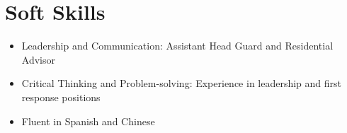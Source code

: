 \documentclass[12pt]{article}       %
\begin{document}
\section*{Soft Skills}
\begin{itemize}
  \item {Leadership and Communication:} Assistant Head Guard and Residential Advisor
  \item {Critical Thinking and Problem-solving:} Experience in leadership and first response positions\\
  \item {Fluent in Spanish and Chinese}
\end{itemize}
\vspace{-6.5pt}

\end{document}
